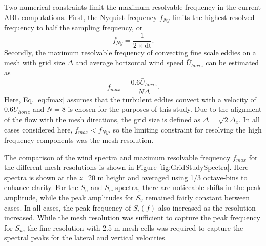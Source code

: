 Two numerical constraints limit the maximum resolvable frequency in
the current ABL computations.  First, the Nyquist frequency $f_{Ny}$
limits the highest resolved frequency to half the sampling frequency, or
\begin{equation}
  f_{Ny} = \frac{1}{2\times \textrm{dt}}.
\end{equation}
Secondly, the maximum resolvable frequency of convecting fine scale
eddies on a mesh with grid size $\Delta$ and average horizontal wind
speed $\bar{U}_{horiz}$ can be estimated as
\begin{equation}
  \label{eq:fmax}
  f_{max} = \frac{0.6\bar{U}_{horiz}}{N\Delta}.
\end{equation}
Here, Eq. \ref{eq:fmax} assumes that the turbulent eddies convect
with a velocity of $0.6\bar{U}_{horiz}$ and $N=8$ is chosen for the
purposes of this study.  Due to the alignment of the flow with the
mesh directions, the grid size is defined as $\Delta = \sqrt{2} \Delta_x $.
In all cases considered here, $f_{max} < f_{Ny}$, so the limiting
constraint for resolving the high frequency components was the mesh
resolution.

The comparison of the wind spectra and maximum resolvable frequency
$f_{max}$ for the different mesh resolutions is shown in Figure
\ref{fig:GridStudySpectra}.  Here spectra is shown at the $z$=20 m
height and averaged using 1/3 octave-bins to enhance clarity. For the
$S_u$ and $S_w$ spectra, there are noticeable shifts in the peak
amplitude, while the peak amplitudes for $S_v$ remained fairly
constant between cases.  In all cases, the peak frequency of $S_i(f)$
also increased as the resolution increased. While the mesh resolution
was sufficient to capture the peak frequency for $S_u$, the fine
resolution with 2.5 m mesh cells was required to capture the spectral
peaks for the lateral and vertical velocities.

